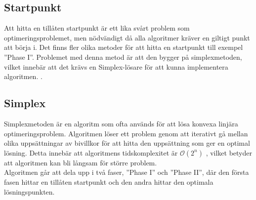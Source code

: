 \subsection{Startpunkt}
Att hitta en tillåten startpunkt är ett lika svårt problem som optimeringsproblemet, men nödvändigt då alla algoritmer kräver en giltigt punkt att börja i. Det finns fler olika metoder för att hitta en startpunkt till exempel ''Phase I''. Problemet med denna metod är att den bygger på simplexmetoden, vilket innebär att det krävs en Simplex-lösare för att kunna implementera algoritmen. \citep{numericaloptimization}.

\subsection{Simplex}
Simplexmetoden är en algoritm som ofta används för att lösa konvexa linjära optimeringsproblem. Algoritmen löser ett problem genom att iterativt gå mellan olika uppsättningar av bivillkor för att hitta den uppsättning som ger en optimal lösning. Detta innebär att algoritmens tidskomplexitet är $\mathcal{O}(2^n)$ \citep{numericaloptimization}, vilket betyder att algoritmen kan bli långsam för större problem. \\
Algoritmen går att dela upp i två faser, ''Phase I'' och ''Phase II'', där den första fasen hittar en tillåten startpunkt och den andra hittar den optimala lösningspunkten.

